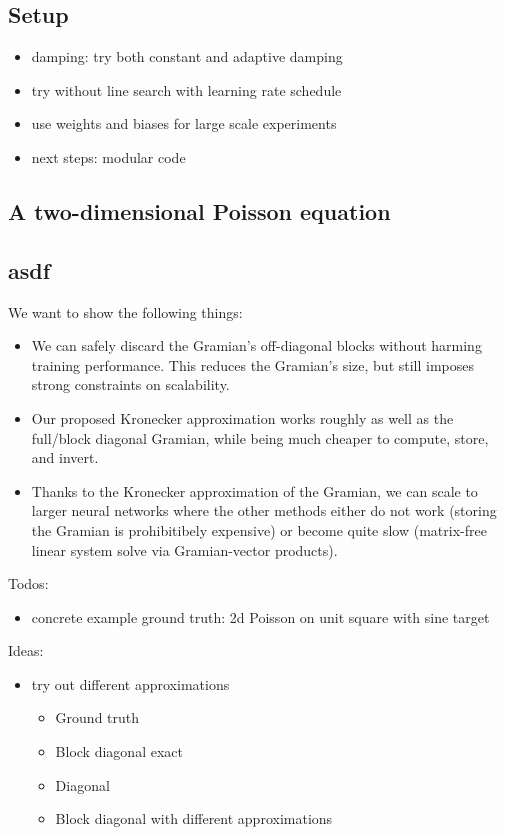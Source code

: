 \subsection{Setup}
\begin{itemize}
    \item damping: try both constant and adaptive damping
    \item try without line search with learning rate schedule
    \item use weights and biases for large scale experiments
    \item next steps: modular code
\end{itemize}

\subsection{A two-dimensional Poisson equation}

\subsection{asdf}

We want to show the following things:
\begin{itemize}
\item We can safely discard the Gramian's off-diagonal blocks without harming
  training performance. This reduces the Gramian's size, but still imposes
  strong constraints on scalability.

\item Our proposed Kronecker approximation works roughly as well as the
  full/block diagonal Gramian, while being much cheaper to compute, store, and
  invert.

\item Thanks to the Kronecker approximation of the Gramian, we can scale to larger neural networks where the other methods either do not work (storing the Gramian is prohibitibely expensive) or become quite slow (matrix-free linear system solve via Gramian-vector products).
\end{itemize}

Todos:
\begin{itemize}
\item concrete example ground truth: 2d Poisson on unit square with sine target
\end{itemize}

Ideas:
\begin{itemize}
\item try out different approximations
  \begin{itemize}
  \item Ground truth
  \item Block diagonal exact
  \item Diagonal
  \item Block diagonal with different approximations
  \end{itemize}
\end{itemize}

